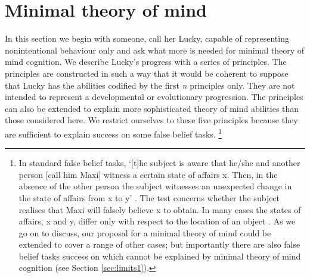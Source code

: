 \documentclass[12pt,\papersize]{extarticle}
\begin{document}







\section{Minimal theory of mind}
\label{sec:minimal}
In this section we begin with someone, call her Lucky, capable  of representing nonintentional behaviour only and ask what more is needed for minimal theory of mind cognition.  We describe Lucky’s progress with a series of principles. The principles are constructed in such a way that it would be coherent to suppose that Lucky has the abilities codified by the first \textit{n} principles only. They are not intended to represent a developmental or evolutionary progression.  The principles can also be extended to explain more sophisticated theory of mind abilities than those considered here.  We restrict ourselves to these five principles because they are sufficient to explain success on some false belief tasks.%
\footnote{
In standard false belief tasks, `[t]he subject is aware that he/she and another person [call him Maxi] witness a certain state of affairs x.  Then, in the absence of the other person the subject witnesses an unexpected change in the state of affairs from x to y' \citep[][p.\ 106]{en_89}.  The test concerns whether the subject realises that Maxi will falsely believe x to obtain.  In many cases the states of affairs, x and y, differ only with respect to the location of an object \citep[e.g.][]{en_1092, en_1208, en_1824}. 
As we go on to discuss, our proposal for a minimal theory of mind could be extended to cover a range of other cases;
but importantly there are also false belief tasks success on which cannot be explained by minimal theory of mind cognition (see Section \vref{sec:limits1}).
}
\end{document}
